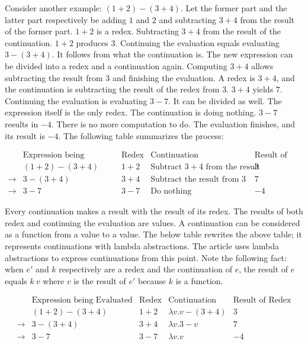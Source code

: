 Consider another example: $(1+2)-(3+4)$. Let the former part and the latter part
respectively be adding $1$ and $2$ and subtracting $3+4$ from the result of the
former part. $1+2$ is a redex. Subtracting $3+4$ from the result of the
continuation. $1+2$ produces $3$. Continuing the evaluation equals evaluating
$3-(3+4)$. It follows from what the continuation is. The new expression can be
divided into a redex and a continuation again. Computing $3+4$ allows subtracting
the result from $3$ and finishing the evaluation. A redex is $3+4$, and the
continuation is subtracting the result of the redex from $3$. $3+4$ yields $7$.
Continuing the evaluation is evaluating $3-7$. It can be divided as well. The
expression itself is the only redex. The continuation is doing nothing. $3-7$
results in $-4$. There is no more computation to do. The evaluation finishes, and
its result is $-4$. The following table summarizes the process:

\[
\begin{array}{ccccc}
&\text{Expression being Evaluated} & \text{Redex} & \text{Continuation} &
\text{Result of Redex} \\
& (1+2)-(3+4) & 1+2 & \text{Subtract }3+4\text{ from the result} & 3 \\
\rightarrow&3-(3+4) & 3+4 & \text{Subtract the result from }3 & 7 \\
\rightarrow&3-7 & 3-7 & \text{Do nothing} & -4
\end{array}
\]

Every continuation makes a result with the result of its redex. The results of
both redex and continuing the evaluation are values. A continuation can be
considered as a function from a value to a value. The below table rewrites the
above table; it represents continuations with lambda abstractions. The article
uses lambda abstractions to express continuations from this point. Note the
following fact: when $e'$ and $k$ respectively are a redex and the continuation
of $e$, the result of $e$ equals $k\ v$ where $v$ is the result of $e'$ because
$k$ is a function.

\[
\begin{array}{ccccc}
&\text{Expression being Evaluated} & \text{Redex} & \text{Continuation} &
\text{Result of Redex} \\
& (1+2)-(3+4) & 1+2 & \lambda v.v-(3+4) & 3 \\
\rightarrow&3-(3+4) & 3+4 & \lambda v.3-v & 7 \\
\rightarrow&3-7 & 3-7 & \lambda v.v & -4
\end{array}
\]

